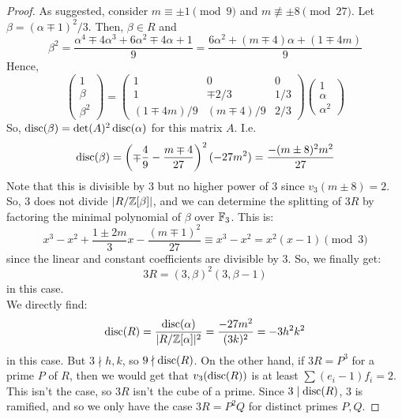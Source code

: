 \begin{proof}
	As suggested, consider $m \equiv \pm 1 \pmod{9}$ and $m \not\equiv \pm 8 \pmod{27}$. Let $\beta = (\alpha \mp 1)^2/3$. Then, $\beta \in R$ and
	\[ \beta^2 = \frac{\alpha^4 \mp 4\alpha^3 + 6\alpha^2 \mp 4\alpha + 1}{9} = \frac{6\alpha^2 + (m \mp 4)\alpha + (1 \mp 4m)}{9} \]
	Hence,
	\[ \left(\begin{array}{c} 1 \\ \beta \\ \beta^2 \end{array}\right) = \left(\begin{array}{ccc} 1 & 0 & 0 \\ 1 & \mp 2/3 & 1/3 \\ (1 \mp 4m)/9 & (m \mp 4)/9 & 2/3 \end{array}\right)\left(\begin{array}{c} 1 \\ \alpha \\ \alpha^2 \end{array}\right) \]
	So, $\operatorname{disc}(\beta) = \det(A)^2\operatorname{disc}(\alpha)$ for this matrix $A$. I.e.
	\[ \operatorname{disc}(\beta) = \left(\mp\frac{4}{9} - \frac{m \mp 4}{27}\right)^2(-27m^2) = \frac{-(m \pm 8)^2m^2}{27} \]
	Note that this is divisible by $3$ but no higher power of 3 since $v_3(m \pm 8) = 2$. So, $3$ does not divide $|R/\mathbb{Z}[\beta]|$, and we can determine the splitting of $3R$ by factoring the minimal polynomial of $\beta$ over $\mathbb{F}_3$. This is:
	\[ x^3 - x^2 + \frac{1 \pm 2m}{3}x - \frac{(m \mp 1)^2}{27} \equiv x^3-x^2 = x^2(x-1) \pmod{3} \]
	since the linear and constant coefficients are divisible by 3. So, we finally get:
	\[ 3R = (3, \beta)^2(3, \beta-1) \]
	in this case. \\
	
	We directly find:
	\[ \operatorname{disc}(R) = \frac{\operatorname{disc}(\alpha)}{|R/\mathbb{Z}[\alpha]|^2} = \frac{-27m^2}{(3k)^2} = -3h^2k^2 \]
	in this case. But $3 \nmid h,k$, so $9 \nmid \operatorname{disc}(R)$. On the other hand, if $3R = P^3$ for a prime $P$ of $R$, then we would get that $v_3(\operatorname{disc}(R))$ is at least $\sum (e_i - 1)f_i = 2$. This isn't the case, so $3R$ isn't the cube of a prime. Since $3 \mid \operatorname{disc}(R)$, 3 is ramified, and so we only have the case $3R = P^2Q$ for distinct primes $P,Q$.
\end{proof}

